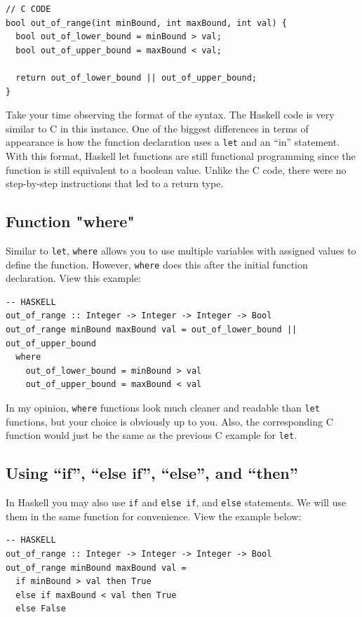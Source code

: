 \documentclass{article}
\begin{document}
\begin{lstlisting}[style=CStyle]
// C CODE
bool out_of_range(int minBound, int maxBound, int val) {
  bool out_of_lower_bound = minBound > val;
  bool out_of_upper_bound = maxBound < val;

  return out_of_lower_bound || out_of_upper_bound;
}
\end{lstlisting}

\medskip\noindent
Take your time observing the format of the syntax. The Haskell code is very similar to C in this instance. One of the biggest differences in terms of appearance is how the function declaration uses a \lstinline{let} and an “in” statement. With this format, Haskell let functions are still functional programming since the function is still equivalent to a boolean value. Unlike the C code, there were no step-by-step instructions that led to a return type.

\subsection{Function "where"}
\medskip\noindent
Similar to \verb|let|, \verb|where| allows you to use multiple variables with assigned values to define the function. However, \verb|where| does this after the initial function declaration. View this example:

\begin{lstlisting}[style=HaskellStyle]
-- HASKELL
out_of_range :: Integer -> Integer -> Integer -> Bool
out_of_range minBound maxBound val = out_of_lower_bound || out_of_upper_bound
  where
    out_of_lower_bound = minBound > val
    out_of_upper_bound = maxBound < val
\end{lstlisting}

\medskip\noindent
In my opinion, \verb|where| functions look much cleaner and readable than \verb|let| functions, but your choice is obviously up to you. Also, the corresponding C function would just be the same as the previous C example for \verb|let|.

\subsection{Using “if”, “else if”, “else”, and “then”}
\medskip\noindent
In Haskell you may also use \verb|if| and \verb|else if|, and \verb|else| statements. We will use them in the same function for convenience. View the example below:

\begin{lstlisting}[style=HaskellStyle]
-- HASKELL
out_of_range :: Integer -> Integer -> Integer -> Bool
out_of_range minBound maxBound val =
  if minBound > val then True
  else if maxBound < val then True
  else False
\end{lstlisting}
\end{document}
